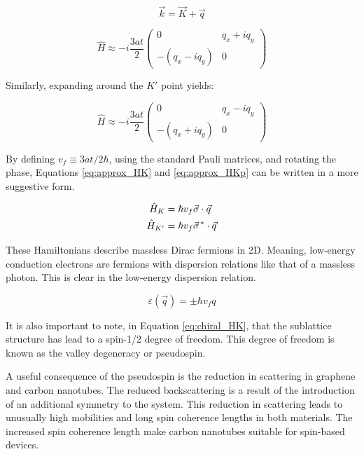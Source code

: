 \begin{equation}
    \vec{k} = \vec{K} + \vec{q}
\end{equation}

\begin{equation}
\label{eq:approx_HK}
    \hat{H} \approx -i\frac{3at}{2} \begin{pmatrix} 0 & q_x+iq_y\\ -(q_x-iq_y)& 0 \end{pmatrix}
\end{equation}

Similarly, expanding around the $K'$ point yields:

\begin{equation}
\label{eq:approx_HKp}
    \hat{H} \approx -i\frac{3at}{2} \begin{pmatrix} 0 & q_x-iq_y\\ -(q_x+iq_y)& 0 \end{pmatrix}
\end{equation}

By defining $v_f \equiv {3at}/{2\hbar}$, using the standard Pauli matrices, and rotating the phase, Equations \ref{eq:approx_HK} and \ref{eq:approx_HKp} can be written in a more suggestive form. 

\begin{align}
    \hat{H}_K &= \hbar v_f \vec{\sigma}\cdot\vec{q} \label{eq:chiral_HK} \\
    \hat{H}_{K'} &= \hbar v_f \pvec{\sigma}^*\cdot\vec{q} \nonumber
\end{align}

These Hamiltonians describe massless Dirac fermions in 2D. Meaning, low-energy conduction electrons are fermions with dispersion relations like that of a massless photon. This is clear in the low-energy dispersion relation.

\begin{equation}
\label{eq:massless_disp}
    \varepsilon(\vec{q}) = \pm\hbar v_f q
\end{equation}

It is also important to note, in Equation \ref{eq:chiral_HK}, that the sublattice structure has lead to a spin-1/2 degree of freedom. This degree of freedom is known as the valley degeneracy or pseudospin. 

A useful consequence of the pseudospin is the reduction in scattering in graphene and carbon nanotubes. The reduced backscattering is a result of the introduction of an additional symmetry to the system. This reduction in scattering leads to unusually high mobilities and long spin coherence lengths in both materials. The increased spin coherence length make carbon nanotubes suitable for spin-based devices.

